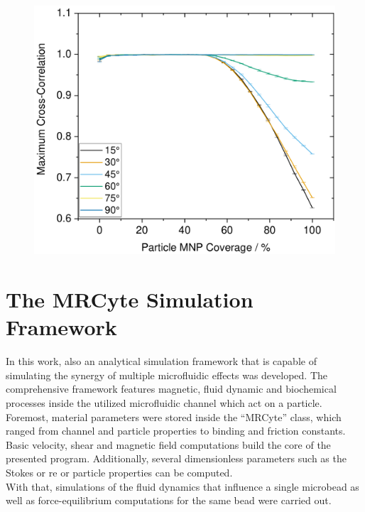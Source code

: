 \begin{figure}[h!]
	\centering
	\includegraphics[width=.7\linewidth]{Ressources/Simulation/Aggregates}	
	\label{fig:sim:aggregates}
\end{figure}
\clearpage

\section{The MRCyte Simulation Framework}
In this work, also an analytical simulation framework that is capable of simulating the synergy of multiple microfluidic effects was developed. The comprehensive framework features magnetic, fluid dynamic and biochemical processes inside the utilized microfluidic channel which act on a particle. Foremost, material parameters were stored inside the ``MRCyte'' class, which ranged from channel and particle properties to binding and friction constants. Basic velocity, shear and magnetic field computations build the core of the presented program. Additionally, several dimensionless parameters such as the Stokes or \gls{re} or particle properties can be computed.\\
With that, simulations of the fluid dynamics that influence a single microbead as well as force-equilibrium computations for the same bead were carried out. 

